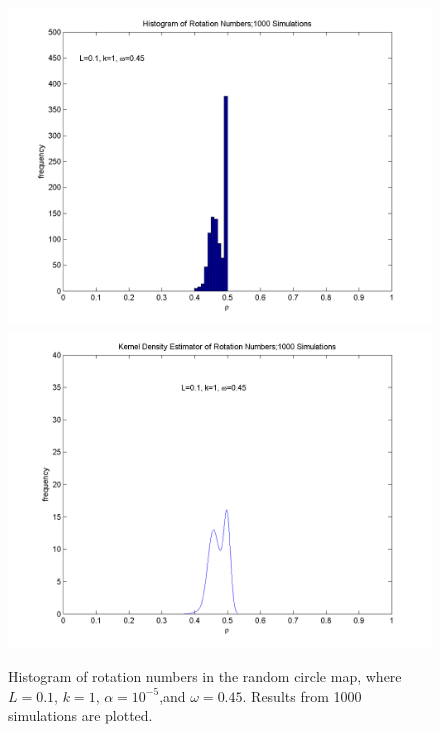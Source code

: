 \begin{figure}[htp]
\caption[Histogram of rotation numbers in the random circle
map]{Histogram of rotation numbers in the random circle map, where
  $L=0.1$, $k=1$, $\alpha = 10^{-5}$,and $\omega = 0.45$. Results from 1000 simulations
  are plotted.}
\centering
\includegraphics[width=.5\textwidth]{figs/hist_rho_k1_L01_om045.png}\hfill
\includegraphics[width=.5\textwidth]{figs/kde_rho_k1_L01_om045.png}
\end{figure}

